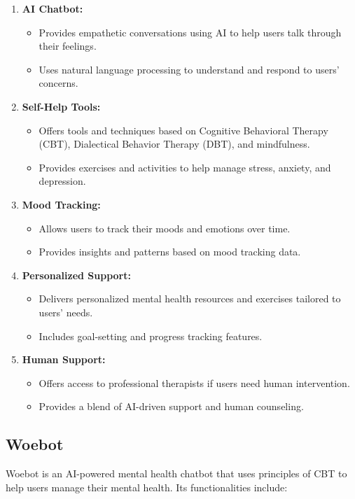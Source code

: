 \begin{enumerate}
    \item \textbf{AI Chatbot:}
    \begin{itemize}
        \item Provides empathetic conversations using AI to help users talk through their feelings.
        \item Uses natural language processing to understand and respond to users' concerns.
    \end{itemize}
    \item \textbf{Self-Help Tools:}
    \begin{itemize}
        \item Offers tools and techniques based on Cognitive Behavioral Therapy (CBT), Dialectical Behavior Therapy (DBT), and mindfulness.
        \item Provides exercises and activities to help manage stress, anxiety, and depression.
    \end{itemize}
    \item \textbf{Mood Tracking:}
    \begin{itemize}
        \item Allows users to track their moods and emotions over time.
        \item Provides insights and patterns based on mood tracking data.
    \end{itemize}
    \item \textbf{Personalized Support:}
    \begin{itemize}
        \item Delivers personalized mental health resources and exercises tailored to users' needs.
        \item Includes goal-setting and progress tracking features.
    \end{itemize}
    \item \textbf{Human Support:}
    \begin{itemize}
        \item Offers access to professional therapists if users need human intervention.
        \item Provides a blend of AI-driven support and human counseling.
    \end{itemize}
\end{enumerate}

\subsection{Woebot}
Woebot is an AI-powered mental health chatbot that uses principles of CBT to help users manage their mental health. Its functionalities include:

